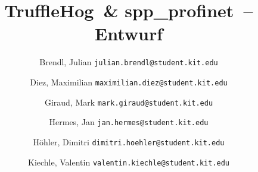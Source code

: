 \documentclass[listof=totoc,a4paper]{scrreprt}
\newcounter{savepage}
\newcommand{\sppname}{spp\_profinet}
\newcommand{\programname}{TruffleHog}
\begin{document}
\title{\programname \ \& \sppname \ -- Entwurf}
\author{
    Brendl, Julian
    \texttt{julian.brendl@student.kit.edu}
    \and
    Diez, Maximilian
    \texttt{maximilian.diez@student.kit.edu}
    \and
    Giraud, Mark
    \texttt{mark.giraud@student.kit.edu}
    \and
    Hermes, Jan
    \texttt{jan.hermes@student.kit.edu}
    \and
    Höhler, Dimitri
    \texttt{dimitri.hoehler@student.kit.edu}
    \and
    Kiechle, Valentin
    \texttt{valentin.kiechle@student.kit.edu}
}

\titlehead{\texttt{[image: images/title.png]}}

\maketitle

\setcounter{page}{2}

\newpage
\tableofcontents
\newpage
\listoffigures

\printglossary[title=Abkürzungsverzeichnis,toctitle=Abkürzungsverzeichnis,type=acronym]

\clearpage
{}
\setcounter{page}{\thesavepage}









\appendix

\printglossary[title=Glossar,toctitle=Glossar]
\end{document}
